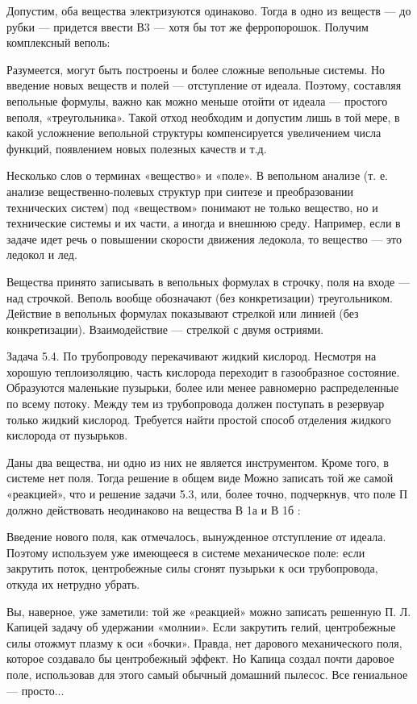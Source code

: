 Допустим,  оба  вещества  электризуются  одинаково. Тогда  в  одно  из
веществ — до рубки — придется ввести В3 — хотя бы тот же ферропорошок.
Получим комплексный веполь:


Разумеется, могут быть построены и более сложные вепольные системы. Но
введение  новых веществ  и  полей —  отступление  от идеала.  Поэтому,
составляя вепольные формулы, важно как можно меньше отойти от идеала —
простого веполя, «треугольника». Такой отход необходим и допустим лишь
в  той мере,  в  какой усложнение  вепольной структуры  компенсируется
увеличением числа функций, появлением новых полезных качеств и т.д.

Несколько слов о терминах «вещество» и «поле». В вепольном анализе (т.
е. анализе  вещественно-полевых структур при синтезе  и преобразовании
технических систем) под «веществом» понимают  не только вещество, но и
технические системы  и их части,  а иногда и внешнюю  среду. Например,
если в  задаче идет  речь о повышении  скорости движения  ледокола, то
вещество — это ледокол и лед.

Вещества принято  записывать в вепольных  формулах в строчку,  поля на
входе  — над  строчкой. Веполь  вообще обозначают  (без конкретизации)
треугольником.  Действие  в  вепольных  формулах  показывают  стрелкой
или  линией (без  конкретизации).  Взаимодействие —  стрелкой с  двумя
остриями.

Задача  5.4. По  трубопроводу перекачивают  жидкий кислород.  Несмотря
на  хорошую теплоизоляцию,  часть кислорода  переходит в  газообразное
состояние. Образуются  маленькие пузырьки, более или  менее равномерно
распределенные  по  всему потоку.  Между  тем  из трубопровода  должен
поступать в резервуар только  жидкий кислород. Требуется найти простой
способ отделения жидкого кислорода от пузырьков.

Даны  два вещества,  ни одно  из них  не является  инструментом. Кроме
того, в  системе нет поля. Тогда  решение в общем виде  Можно записать
той же самой  «реакцией», что и решение задачи 5.3,  или, более точно,
подчеркнув, что поле П должно действовать неодинаково на вещества В 1а
и В 1б :


Введение  нового  поля,  как отмечалось,  вынужденное  отступление  от
идеала.  Поэтому  используем  уже  имеющееся  в  системе  механическое
поле: если  закрутить поток, центробежные  силы сгонят пузырьки  к оси
трубопровода, откуда их нетрудно убрать.

Вы, наверное, уже заметили: той  же «реакцией» можно записать решенную
П.  Л. Капицей  задачу об  удержании «молнии».  Если закрутить  гелий,
центробежные силы отожмут  плазму к оси «бочки».  Правда, нет дарового
механического  поля,  которое  создавало бы  центробежный  эффект.  Но
Капица создал почти даровое поле,  использовав для этого самый обычный
домашний пылесос. Все гениальное — просто...

